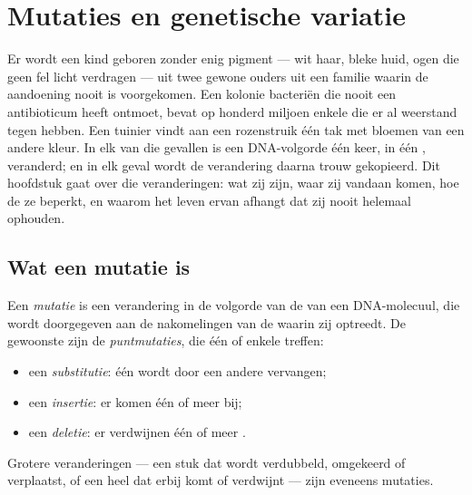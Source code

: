 \chapter{Mutaties en genetische variatie}\label{ch:g11:mutations}

Er wordt een kind geboren zonder enig pigment --- wit haar, bleke huid,
ogen die geen fel licht verdragen --- uit twee gewone ouders uit een
familie waarin de aandoening nooit is voorgekomen. Een kolonie bacteriën
die nooit een antibioticum heeft ontmoet, bevat op honderd miljoen 
enkele die er al weerstand tegen hebben. Een tuinier vindt aan een
rozenstruik één tak met bloemen van een andere kleur. In elk van die
gevallen is een DNA-volgorde één keer, in één , veranderd; en in elk
geval wordt de verandering daarna trouw gekopieerd. Dit hoofdstuk gaat
over die veranderingen: wat zij zijn, waar zij vandaan komen, hoe de 
ze beperkt, en waarom het leven ervan afhangt dat zij nooit helemaal
ophouden.

\section{Wat een mutatie is}

\begin{definition}[Mutatie]\label{def:g11:mutations:mutation}
Een \emph{mutatie} is een verandering in de volgorde van
de  van een DNA-molecuul, die wordt doorgegeven aan de
nakomelingen van de  waarin zij optreedt. De gewoonste zijn de
\emph{puntmutaties}, die één of enkele  treffen:
\begin{itemize}
  \item een \emph{substitutie}: één  wordt door een andere
        vervangen;
  \item een \emph{insertie}: er komen één of meer  bij;
  \item een \emph{deletie}: er verdwijnen één of meer .
\end{itemize}
Grotere veranderingen --- een stuk dat wordt verdubbeld, omgekeerd of
verplaatst, of een heel  dat erbij komt of verdwijnt --- zijn
eveneens mutaties.
\end{definition}

